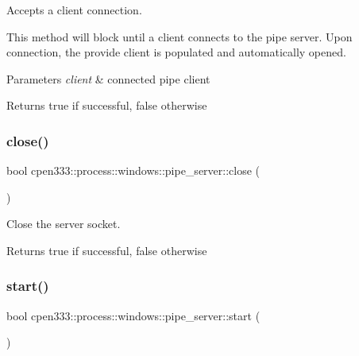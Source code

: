 Accepts a client connection. 

This method will block until a client connects to the pipe server. Upon connection, the provide client is populated and automatically opened.


\begin{DoxyParams}{Parameters}
{\em client} & connected pipe client \\
\hline
\end{DoxyParams}
\begin{DoxyReturn}{Returns}
true if successful, false otherwise 
\end{DoxyReturn}
\mbox{\label{classcpen333_1_1process_1_1windows_1_1pipe__server_a4c27e283566395d1f7236bff91413737}} 
\subsubsection{\texorpdfstring{close()}{close()}}
{\footnotesize\ttfamily bool cpen333\+::process\+::windows\+::pipe\+\_\+server\+::close (\begin{DoxyParamCaption}{ }\end{DoxyParamCaption})\hspace{0.3cm}{\ttfamily [inline]}}



Close the server socket. 

\begin{DoxyReturn}{Returns}
true if successful, false otherwise 
\end{DoxyReturn}
\mbox{\label{classcpen333_1_1process_1_1windows_1_1pipe__server_a154fb75caf8fc068ab2d6a0a70e96bc9}} 
\subsubsection{\texorpdfstring{start()}{start()}}
{\footnotesize\ttfamily bool cpen333\+::process\+::windows\+::pipe\+\_\+server\+::start (\begin{DoxyParamCaption}{ }\end{DoxyParamCaption})\hspace{0.3cm}{\ttfamily [inline]}}



